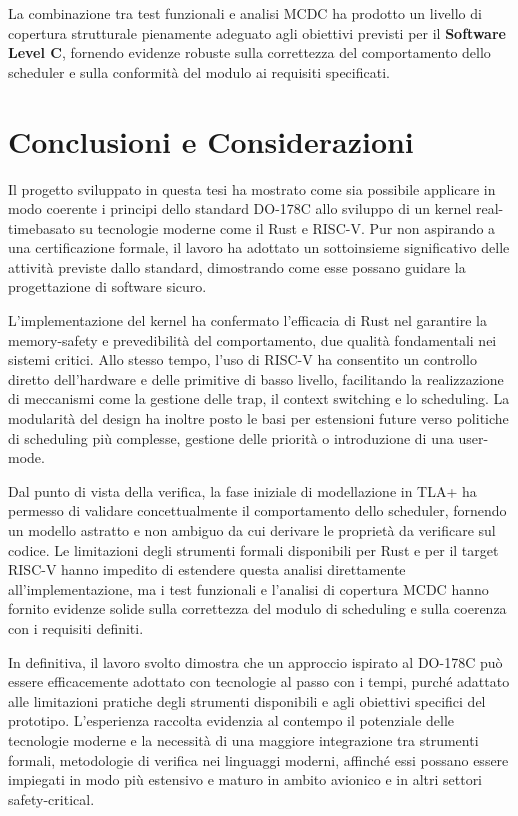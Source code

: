 \documentclass[italian, Lau, oneside]{sapthesis} %
\begin{document}
La combinazione tra test funzionali e analisi MCDC ha prodotto un livello di copertura strutturale pienamente adeguato agli obiettivi previsti per il \textbf{Software Level C}, fornendo evidenze robuste sulla correttezza del comportamento dello scheduler e sulla conformità del modulo ai requisiti specificati.

\chapter*{Conclusioni e Considerazioni}
\label{cap:5}

Il progetto sviluppato in questa tesi ha mostrato come sia possibile applicare in modo coerente i principi dello standard DO-178C allo sviluppo di un kernel real-timebasato su tecnologie moderne come il Rust e RISC-V. Pur non aspirando a una certificazione formale, il lavoro ha adottato un sottoinsieme significativo delle attività previste dallo standard, dimostrando come esse possano guidare la progettazione di software sicuro.

L’implementazione del kernel ha confermato l’efficacia di Rust nel garantire la memory-safety e prevedibilità del comportamento, due qualità fondamentali nei sistemi critici. Allo stesso tempo, l’uso di RISC-V ha consentito un controllo diretto dell’hardware e delle primitive di basso livello, facilitando la realizzazione di meccanismi come la gestione delle trap, il context switching e lo scheduling. La modularità del design ha inoltre posto le basi per estensioni future verso politiche di scheduling più complesse, gestione delle priorità o introduzione di una user-mode.

Dal punto di vista della verifica, la fase iniziale di modellazione in TLA+ ha permesso di validare concettualmente il comportamento dello scheduler, fornendo un modello astratto e non ambiguo da cui derivare le proprietà da verificare sul codice. Le limitazioni degli strumenti formali disponibili per Rust e per il target RISC-V hanno impedito di estendere questa analisi direttamente all’implementazione, ma i test funzionali e l’analisi di copertura MCDC hanno fornito evidenze solide sulla correttezza del modulo di scheduling e sulla coerenza con i requisiti definiti.

In definitiva, il lavoro svolto dimostra che un approccio ispirato al DO-178C può essere efficacemente adottato con tecnologie al passo con i tempi, purché adattato alle limitazioni pratiche degli strumenti disponibili e agli obiettivi specifici del prototipo. L’esperienza raccolta evidenzia al contempo il potenziale delle tecnologie moderne e la necessità di una maggiore integrazione tra strumenti formali, metodologie di verifica nei linguaggi moderni, affinché essi possano essere impiegati in modo più estensivo e maturo in ambito avionico e in altri settori safety-critical.
\end{document}
